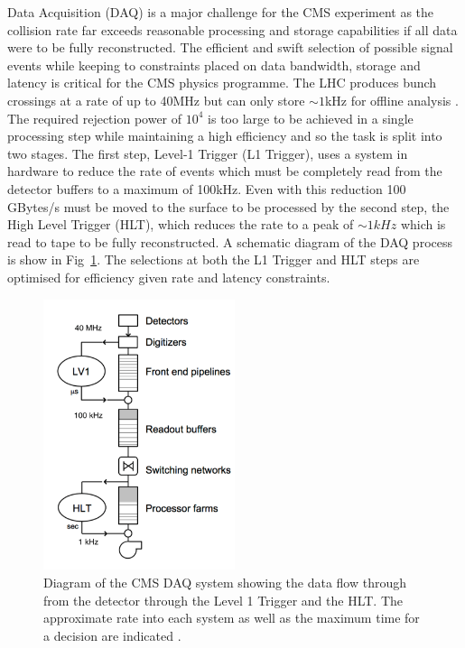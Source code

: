Data Acquisition (DAQ) is a major challenge for the CMS experiment as the collision rate far exceeds reasonable processing 
and storage capabilities if all data were to be fully reconstructed. The efficient and swift selection of
possible signal events while keeping to constraints placed on data bandwidth, storage and latency is critical
for the CMS physics programme. The LHC produces bunch crossings at a rate of up to 40MHz but can only
store $\sim1$kHz for offline analysis \cite{daq_tdr}. The required rejection power of $10^4$ is too large to be achieved
in a single processing step while maintaining a high efficiency and so the task is split into two stages.
The first step, Level-1 Trigger (L1 Trigger), uses a system in hardware to reduce the rate of events which must be completely 
read from the detector buffers to a maximum of 100kHz. Even with this reduction 100 GBytes/s must be moved to the surface
to be processed by the second step, the High Level Trigger (HLT), which reduces the rate to a peak of $\sim 1kHz$ which is 
read to tape to be fully reconstructed. A schematic diagram of the DAQ process is show in Fig~\ref{fig:DAQ_SLICE}. 
The selections at both the L1 Trigger and HLT steps are optimised for efficiency given rate and latency constraints.

\begin{figure}
\centering
    \includegraphics[width=0.5\textwidth]{./Figures/detector/daq_sys}
  \caption{Diagram of the CMS DAQ system showing the data flow through from the detector through the Level 1 Trigger
and the HLT. The approximate rate into each system as well as the maximum time for a decision are indicated \cite{daq_tdr}.}
  \label{fig:DAQ_SLICE}
\end{figure}

